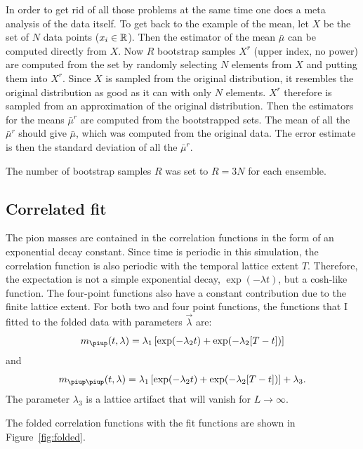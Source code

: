 \documentclass[11pt, english, fleqn, DIV=10, headinclude]{scrartcl}
\begin{document}
In order to get rid of all those problems at the same time one does a meta
analysis of the data itself. To get back to the example of the mean, let $X$ be
the set of $N$ data points ($x_i \in \mathbb R$). Then the estimator of the mean
$\bar\mu$ can be computed directly from $X$. Now $R$ bootstrap samples $X^r$
(upper index, no power) are computed from the set by randomly selecting $N$
elements from $X$ and putting them into $X^r$. Since $X$ is sampled from the
original distribution, it resembles the original distribution as good as it can
with only $N$ elements. $X^r$ therefore is sampled from an approximation of the
original distribution. Then the estimators for the means $\bar\mu^r$ are
computed from the bootstrapped sets. The mean of all the $\bar\mu^r$ should
give $\bar\mu$, which was computed from the original data. The error estimate
is then the standard deviation of all the $\bar\mu^r$.
\parencite[Slide~5]{Oser/Bootstrap}

The number of bootstrap samples $R$ was set to $R = 3N$ for each ensemble.

\subsection{Correlated fit}
\label{sec:correlated_fit}

The pion masses are contained in the correlation functions in the form of an
exponential decay constant. Since time is periodic in this simulation, the
correlation function is also periodic with the temporal lattice extent $T$.
Therefore, the expectation is not a simple exponential decay, $\exp(-\lambda
t)$, but a cosh-like function. The four-point functions also have a constant
contribution due to the finite lattice extent. For both two and four point
functions, the functions that I fitted to the folded data with parameters $\vec
\lambda$ are:
\begin{equation}
    \label{eq:fit2}
    m_\piup(t, \lambda) = \lambda_1 \sbr{\exp(-\lambda_2 t) + \exp(-\lambda_2
    [T - t])}
\end{equation}
and
\begin{equation}
    \label{eq:fit4}
    m_{\piup\piup}(t, \lambda) = \lambda_1 \sbr{\exp(-\lambda_2 t) + \exp(-\lambda_2
    [T - t])} + \lambda_3.
\end{equation}
The parameter $\lambda_3$ is a lattice artifact that will vanish for $L \to
\infty$.

The folded correlation functions with the fit functions are shown in
Figure~\ref{fig:folded}.
\end{document}
